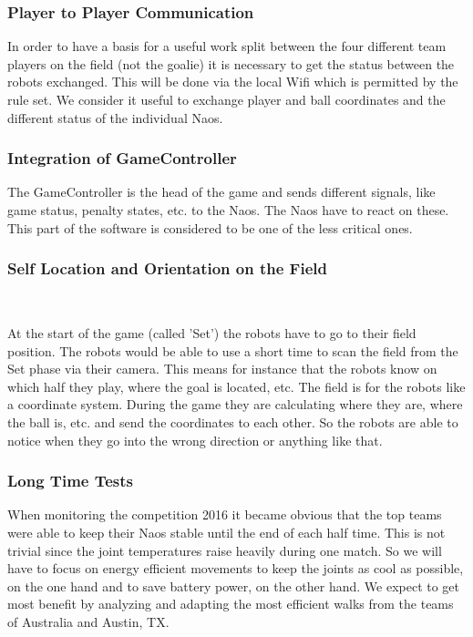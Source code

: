 \documentclass[12pt]{article}
\theoremstyle{definition}
\newcommand{\unclear}[1]{\vspace{.5em}\parbox{.9\linewidth}{\color{red}{\bf Remark: #1}}\vspace{.5em}}
\begin{document}

\subsubsection{Player to Player Communication}
In order to have a basis for a useful work split between the four different team players on the field (not the goalie) it is necessary to get the status between the robots exchanged. This will be done via the local Wifi which is permitted by the rule set. We consider it useful to exchange player and ball coordinates and the different status of the individual Naos.

\subsubsection{Integration of GameController}
The GameController is the head of the game and sends different signals, like game status, penalty states, etc. to the Naos. The Naos have to react on these. This part of the software is considered to be one of the less critical ones.

\subsubsection{Self Location and Orientation on the Field}
\unclear{This is hard to grasp what you want to do here}\\
\unclear{We also edited this section}
At the start of the game (called 'Set') the robots have to go to their field position. The robots would be able to use a short time to scan the field from the Set phase via their camera. This means for instance that the robots know on which half they play, where the goal is located, etc. The field is for the robots like a coordinate system. During the game they are calculating where they are, where the ball is, etc. and send the coordinates to each other. So the robots are able to notice when they go into the wrong direction or anything like that. 

\subsubsection{Long Time Tests}
When monitoring the competition 2016 it became obvious that the top teams were able to keep their Naos stable until the end of each half time. This is not trivial since the joint temperatures raise heavily during one match. So we will have to focus on energy efficient movements to keep the joints as cool as possible, on the one hand and to save battery power, on the other hand. We expect to get most benefit by analyzing and adapting the most efficient walks from the teams of Australia and Austin, TX.
\end{document}
